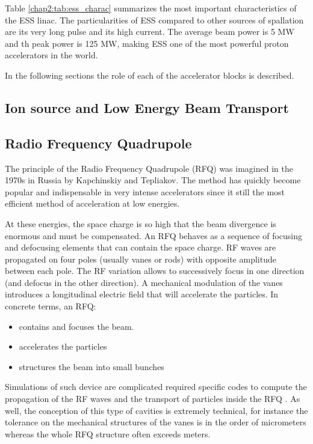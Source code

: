 \begin{refsection}
  

  Table \ref{chap2:tab:ess_charac} summarizes the most important characteristics of the ESS linac. The particularities of ESS compared to other sources of spallation are its very long pulse and its high current. The average beam power is 5 MW and th peak power is 125 MW, making ESS one of the most powerful proton accelerators in the world.

  

  In the following sections the role of each of the accelerator blocks is described.

  \subsection{Ion source and Low Energy Beam Transport}

  \subsection{Radio Frequency Quadrupole}
  The principle of the Radio Frequency Quadrupole (RFQ) was imagined in the 1970s in Russia by Kapchinskiy and Tepliakov. The method has quickly become popular and indispensable in very intense accelerators since it still the most efficient method of acceleration at low energies.

  At these energies, the space charge is so high that the beam divergence is enormous and must be compensated. An RFQ behaves as a sequence of focusing and defocusing elements that can contain the space charge. RF waves are propagated on four poles (usually vanes or rods) with opposite amplitude between each pole. The RF variation allows to successively focus in one direction (and defocus in the other direction). A mechanical modulation of the vanes introduces a longitudinal electric field that will accelerate the particles. In concrete terms, an RFQ:
  \begin{itemize}
    \item contains and focuses the beam.
    \item accelerates the particles
    \item structures the beam into small bunches
  \end{itemize}

  Simulations of such device are complicated required specific codes to compute the propagation of the RF waves and the transport of particles inside the RFQ \cite{Duperrier2000}. As well, the conception of this type of cavities is extremely technical, for instance the tolerance on the mechanical structures of the vanes is in the order of micrometers whereas the whole RFQ structure often exceeds meters.


\end{refsection}
